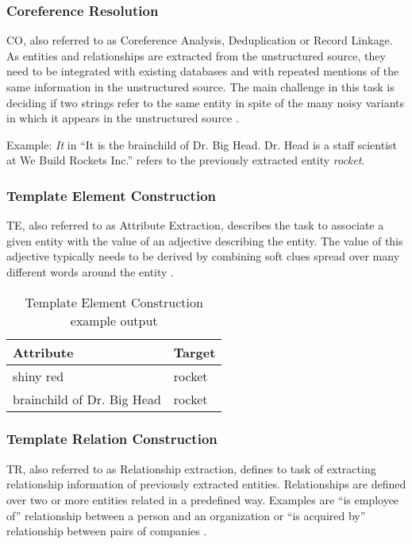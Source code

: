 \subsubsection{Coreference Resolution}
\gls{CO}, also referred to as Coreference Analysis, Deduplication or Record Linkage. As entities and relationships are extracted from the unstructured source, they need to be integrated with existing databases and with repeated mentions of the same information in the unstructured source. The main challenge in this task is deciding if two strings refer to the same entity in spite of the many noisy variants in which it appears in the unstructured source \cite{Sarawagi:2008}.

Example: \textit{It} in \enquote{It is the brainchild of Dr. Big Head. Dr. Head is a staff scientist at We Build Rockets Inc.} refers to the previously extracted entity \textit{rocket}.

\subsubsection{Template Element Construction}
\gls{TE}, also referred to as Attribute Extraction, describes the task to associate a given entity with the value of an adjective describing the entity. The value of this adjective typically needs to be derived by combining soft clues spread over many different words around the entity
 \cite{Sarawagi:2008}.

\begin{table}[H]
\centering
\begin{tabular*}{\textwidth}{ l  l }
	\toprule
	\textbf{Attribute} & \textbf{Target} \\
	\midrule
	shiny red & rocket \\
	brainchild of Dr. Big Head & rocket \\
	\bottomrule
\end{tabular*}
\caption{Template Element Construction example output}
\end{table}

\subsubsection{Template Relation Construction}
\gls{TR}, also referred to as Relationship extraction, defines to task of extracting relationship information of previously extracted entities. Relationships are defined over two or more entities related in a predefined way. Examples are \enquote{is employee of} relationship between a person and an organization or \enquote{is acquired by} relationship between pairs of companies \cite{Sarawagi:2008}.


